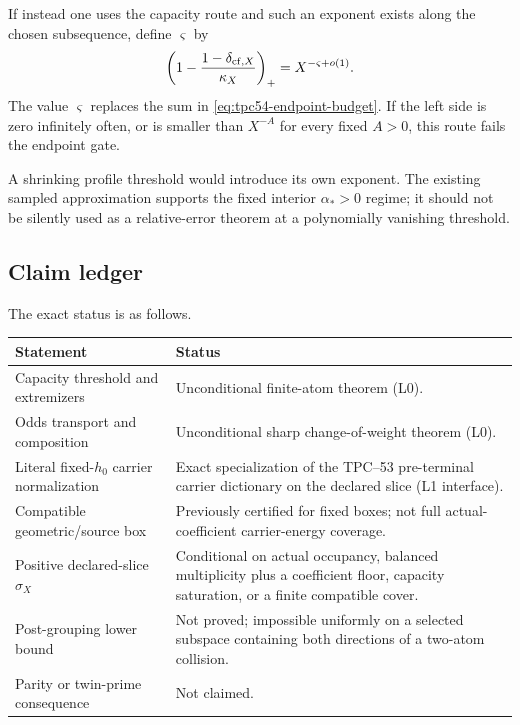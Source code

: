 If instead one uses the capacity route and such an exponent exists along
the chosen subsequence, define \(\varsigma\) by
\[
 \left(1-\frac{1-\delta_{{\rm cf},X}}{\kappa_X}\right)_+
 =X^{-\varsigma+o(1)}.
\]
The value \(\varsigma\) replaces the sum in
\eqref{eq:tpc54-endpoint-budget}.  If the left side is zero infinitely
often, or is smaller than \(X^{-A}\) for every fixed \(A>0\), this route
fails the endpoint gate.

A shrinking profile threshold would introduce its own exponent.  The
existing sampled approximation supports the fixed interior
\(\alpha_*>0\) regime; it should not be silently used as a relative-error
theorem at a polynomially vanishing threshold.

\subsection{Claim ledger}

The exact status is as follows.

\begin{center}
\small
\begin{tabular}{>{\raggedright\arraybackslash}p{}
                >{\raggedright\arraybackslash}p{}}
\toprule
Statement & Status \\
\midrule
Capacity threshold and extremizers & Unconditional finite-atom theorem
(L0). \\
Odds transport and composition & Unconditional sharp change-of-weight
theorem (L0). \\
Literal fixed-\(h_0\) carrier normalization & Exact specialization of the
TPC--53 pre-terminal carrier dictionary on the declared slice (L1
interface). \\
Compatible geometric/source box & Previously certified for fixed boxes;
not full actual-coefficient carrier-energy coverage. \\
Positive declared-slice \(\sigma_X\) & Conditional on actual occupancy,
balanced multiplicity plus a coefficient floor, capacity saturation, or a
finite compatible cover. \\
Post-grouping lower bound & Not proved; impossible uniformly on a selected
subspace containing both directions of a two-atom collision. \\
Parity or twin-prime consequence & Not claimed. \\
\bottomrule
\end{tabular}
\end{center}

